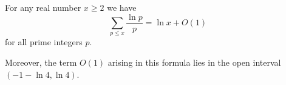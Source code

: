 \documentclass[12pt]{article}
\begin{document}
For any real number $x \geq 2$ we have
\[ \sum_{p \leq x} \frac{\ln p}{p} = \ln x + O(1) \] for all prime integers $p$.

Moreover, the term $O(1)$ arising in this formula lies in the open interval $(-1-\ln 4, \ln 4)$.
\end{document}
